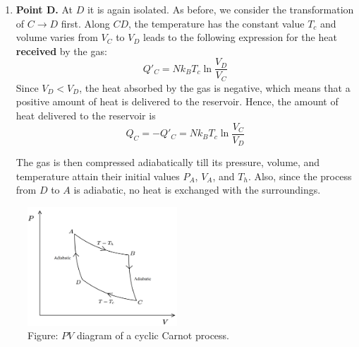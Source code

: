 \documentclass[../../../Main.tex]{subfiles}
\begin{document}
\begin{enumerate}
    \item \textbf{Point D.} At $ D$ it is again isolated. As before, we consider the transformation of $C\rightarrow D$ first. Along $CD$, the temperature has the constant value $T_c$ and volume varies from $V_C$ to $V_D$ leads to the following expression for the heat \textbf{received} by the gas:
    \begin{equation*}
        Q'_C=Nk_BT_c\ln \frac{V_D}{V_C}
    \end{equation*}
    Since $V_D < V_D$, the heat absorbed by the gas is negative, which means that a positive amount of heat is delivered to the reservoir. Hence, the amount of heat delivered to the reservoir is 
    \begin{equation*}
        Q_C=-Q'_C=Nk_BT_c\ln\frac{V_C}{V_D}
    \end{equation*}
    
    The gas is then compressed adiabatically till its pressure, volume, and temperature attain their initial values $P_A$, $V_A$, and $T_h$. Also, since the process from $D$ to $A$ is adiabatic, no heat is exchanged with the surroundings. 
\end{enumerate}

\begin{figure}
    \centering
    \includegraphics[width=0.5\textwidth]{../../../Rss/Themodynamics/KeyConcepts/CylicCarnot.png}
    \caption*{Figure: $PV$ diagram of a cyclic Carnot process.}
\end{figure}
\end{document}
